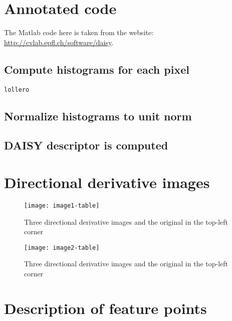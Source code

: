 
\section{Annotated code}

The Matlab code here is taken from the website: \url{http://cvlab.epfl.ch/software/daisy}.

\subsection{Compute histograms for each pixel}

\begin{lstlisting}
lollero
\end{lstlisting}

\subsection{Normalize histograms to unit norm}

\subsection{DAISY descriptor is computed}

\section{Directional derivative images}

\begin{figure}\label{fig:face}
  \texttt{[image: image1-table]}
  \caption{Three directional derivative images and the original in the top-left
  corner}
\end{figure}

\begin{figure}\label{fig:grasshopper}
  \texttt{[image: image2-table]}
  \caption{Three directional derivative images and the original in the top-left
  corner}
\end{figure}

\section{Description of feature points}
